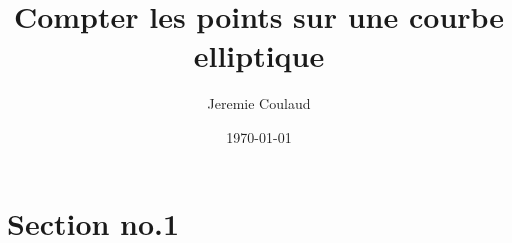 \documentclass{beamer}
\begin{document}
\title{Compter les points sur une courbe elliptique}   
\author{Jeremie Coulaud} 
\date{\today} 

\frame{\titlepage} 



\section{Section no.1} 

\end{document}
